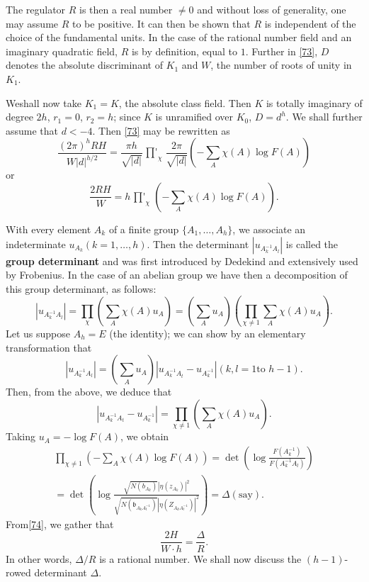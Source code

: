 The regulator $R$ is then a real number $\neq 0$ and without loss of
generality, one may assume $R$ to be positive. It can then be shown
that $R$ is independent of the choice of the fundamental units. In the
case of the rational number field and an imaginary quadratic field,
$R$ is by definition, equal to $1$. Further in \eqref{73}, $D$ denotes
the absolute discriminant of $K_{1}$ and $W$, the number of roots of
unity in $K_{1}$.

We\pageoriginale shall now take $K_{1}=K$, \ie the absolute class
field. Then $K$ is totally imaginary of degree $2h$, \ie $r_{1}=0$,
$r_{2}=h$; since $K$ is unramified over $K_{0}$, $D=d^{h}$. We shall
further assume that $d<-4$. Then \eqref{73} may be rewritten as
$$
\frac{(2\pi)^{h}RH}{W|d|^{h/2}}=\frac{\pi
  h}{\sqrt{|d|}}\mathop{{\prod}'}_{\chi}\frac{2\pi}{\sqrt{|d|}}\left(-\sum_{A}\chi(A)\log
F(A)\right)
$$
or
\begin{equation*}
\frac{2RH}{W}=h\mathop{{\prod}'}_{\chi}\left(-\sum_{A}\chi(A)\log
F(A)\right).\tag{74}\label{74} 
\end{equation*}

With every element $A_{k}$ of a finite group $\{A_{1},\ldots,A_{h}\}$,
we associate an indeterminate $u_{A_{k}}(k=1,\ldots,h)$. Then the
determinant $|u_{A^{-1}_{k}A_{l}}|$ is called the {\bf group
  determinant} and was first introduced by Dedekind and extensively
used by Frobenius. In the case of an abelian group we have then a
decomposition of this group determinant, as follows:
$$
\left|u_{A^{-1}_{k}A_{l}}\right|=\prod_{\chi}\left(\sum_{A}\chi(A)u_{A}\right)=\left(\sum_{A}u_{A}\right)\left(\prod_{\chi\neq
  1}\sum_{A}\chi(A)u_{A}\right).
$$
Let us suppose $A_{h}=E$ (the identity); we can show by an elementary
transformation that
$$
\left|u_{A^{-1}_{k}A_{l}}\right|=\left(\sum_{A}u_{A}\right)\left|u_{A^{-1}_{k}A_{t}}-u_{A^{-1}_{k}}\right|(k,l=1\text{
  \  to \ } h-1).
$$
Then, from the above, we deduce that
$$
\left|u_{A^{-1}_{k}A_{t}}-u_{A^{-1}_{k}}\right|=\prod_{\chi\neq
  1}\left(\sum_{A}\chi(A)u_{A}\right).
$$
Taking $u_{A}=-\log F(A)$, we obtain
\begin{multline*}
\prod_{\chi\neq 1}\left(-\sum_{A}\chi(A)\log F(A)\right)=\det
\left(\log \frac{F(A^{-1}_{k})}{F(A^{-1}_{k}A_{l})}\right)\\
=\det\left(\log\frac{\sqrt{N(b_{A_{k}})}|\eta(z_{A_{k}})|^{2}}{\sqrt{N(\mathfrak{b}_{A_{k}A^{-1}_{t}})}|\eta(Z_{A_{k}A^{-1}_{t}})|^{2}}\right)=\Delta(\text{say}).
\end{multline*}
From\pageoriginale \ref{74}, we gather that
\begin{equation*}
\frac{2H}{W\cdot h}=\frac{\Delta}{R}.\tag{75}\label{75}
\end{equation*}
In other words, $\Delta/R$ is a rational number. We shall now discuss
the $(h-1)$-rowed determinant $\Delta$.

